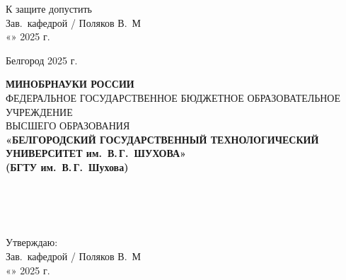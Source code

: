 \begin{center}
	\begin{minipage}{11cm}
		К защите допустить\\[1em]
		Зав.\ кафедрой \underline{\hspace{4cm}} / Поляков В.\ М\\[1em]
		«\underline{\hspace{1cm}}» \underline{\hspace{4cm}} 2025 г.
	\end{minipage}
\end{center}

\vfill
\begin{center}
	Белгород 2025 г.
\end{center}

\newpage
{}

\begin{center}
	\textbf{МИНОБРНАУКИ РОССИИ}\\[0.5em]
	\vspace{0.2em}
	{\scriptsize ФЕДЕРАЛЬНОЕ ГОСУДАРСТВЕННОЕ БЮДЖЕТНОЕ ОБРАЗОВАТЕЛЬНОЕ УЧРЕЖДЕНИЕ\\[-0.5em]
		ВЫСШЕГО ОБРАЗОВАНИЯ}\\[0.5em]
	{\small \textbf{«БЕЛГОРОДСКИЙ ГОСУДАРСТВЕННЫЙ ТЕХНОЛОГИЧЕСКИЙ\\
		УНИВЕРСИТЕТ им.\ В.\,Г.\ ШУХОВА»\\[-0.3em]
		(БГТУ им.\ В.\,Г.\ Шухова)}}
\end{center}

\vspace{1em}

\begin{flushleft}
	{\footnotesize
		\\
		\\
		\\
	}
\end{flushleft}

\begin{flushright}
	\begin{minipage}{8.5cm}
		\scriptsize
		Утверждаю:\\
		Зав.\ кафедрой \underline{\hspace{4cm}} / Поляков В.\ М\\[0.5em]
		«\underline{\hspace{1cm}}» \underline{\hspace{4cm}} 2025 г.
	\end{minipage}
\end{flushright}

